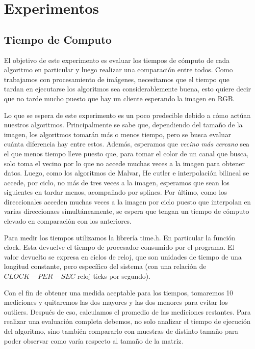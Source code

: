 \documentclass[10pt, a4paper]{article}
\begin{document}
\section{Experimentos}
\subsection{Tiempo de Computo}

El objetivo de este experimento es evaluar los tiempos de c\'omputo de cada algoritmo en particular y luego realizar una comparaci\'on entre todos. Como trabajamos con procesamiento de im\'agenes, necesitamos que el tiempo que tardan en ejecutarse los algoritmos sea considerablemente buena, esto quiere decir que no tarde mucho puesto que hay un cliente esperando la imagen en RGB. 

Lo que se espera de este experimento es un poco predecible debido a c\'omo act\'uan nuestros algoritmos. Principalmente se sabe que, dependiendo del tamaño de la imagen, los algoritmos tomar\'an m\'as o menos tiempo, pero se busca evaluar cu\'anta diferencia hay entre estos. Adem\'as, esperamos que \textit{vecino m\'as cercano} sea el que menos tiempo lleve puesto que, para tomar el color de un canal que busca, solo toma el vecino por lo que no accede muchas veces a la imagen para obtener datos. Luego, como los algoritmos de Malvar, He cutler e interpolaci\'on bilineal se accede, por ciclo, no m\'as de tres veces a la imagen, esperamos que sean los siguientes en tardar menos, acompañado por splines. Por \'ultimo, como los direccionales acceden muchas veces a la imagen por ciclo puesto que interpolan en varias direccionaes simult\'aneamente, se espera que tengan un tiempo de c\'omputo elevado en comparaci\'on con los anteriores. 

Para medir los tiempos utilizamos la librer\'ia time.h. En particular la funci\'on clock. Esta devuelve el tiempo de procesador consumido por el programa. El valor devuelto se expresa en ciclos de reloj, que son unidades de tiempo de una longitud constante, pero específico del sistema (con una relación de $CLOCK-PER-SEC$ reloj ticks por segundo).

Con el fin de obtener una medida aceptable para los tiempos, tomaremos 10 mediciones y quitaremos las dos mayores y las dos menores para evitar los outliers. Despu\'es de eso, calculamos el promedio de las mediciones restantes. Para realizar una evaluaci\'on completa debemos, no solo analizar el tiempo de ejecuci\'on del algoritmo, sino tambi\'en  compararlo con muestras de distinto tamaño para poder observar como var\'ia respecto al tamaño de la matriz. 
\end{document}
